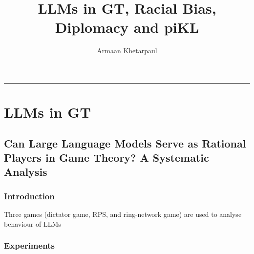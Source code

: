 \documentclass[12pt]{article}
\date{}
\title{\textbf{LLMs in GT, Racial Bias, Diplomacy and piKL}}
\author{Armaan Khetarpaul}
\begin{document}
\maketitle
\hrule height 2pt \relax
\section{LLMs in GT}
\subsection{Can Large Language Models Serve as Rational Players in Game Theory?
A Systematic Analysis}
\subsubsection{Introduction}
Three games (dictator game, RPS, and ring-network game) are used to analyse behaviour of LLMs
\subsubsection{Experiments}
\end{document}

